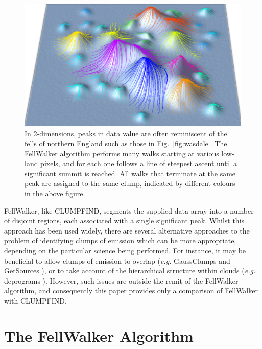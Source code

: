 \documentclass[final,authoryear,5p,times,twocolumn]{elsarticle}
\begin{document}
\begin{figure}
\includegraphics[width=\columnwidth]{fellwalking}
\caption{In 2-dimensions, peaks in data value are often reminiscent of the
fells of northern England such as those in Fig.~\ref{fig:wasdale}. The
FellWalker algorithm performs many walks starting at various low-land
pixels, and for each one follows a line of steepest ascent until a
significant summit is reached. All walks that terminate at the same peak
are assigned to the same clump, indicated by different colours in the
above figure.}
\label{fig:fellwalking}
\end{figure}

FellWalker, like CLUMPFIND, segments the supplied data array into a
number of disjoint regions, each associated with a single significant
peak. Whilst this approach has been used widely, there are several
alternative approaches to the problem of identifying clumps of emission
which can be more appropriate, depending on the particular science being
performed. For instance, it may be beneficial to allow clumps of emission
to overlap (\emph{e.g.} GaussClumps \cite[][]{1990ApJ...356..513S} 
and GetSources \cite{GetSources}), or to take account of the hierarchical 
structure within clouds (\emph{e.g.} deprograms \cite{2008Rosolowsky}). However, 
such issues are outside the remit of the FellWalker algorithm, and consequently 
this paper provides only a comparison of FellWalker with CLUMPFIND.

\section{The FellWalker Algorithm}
\end{document}
